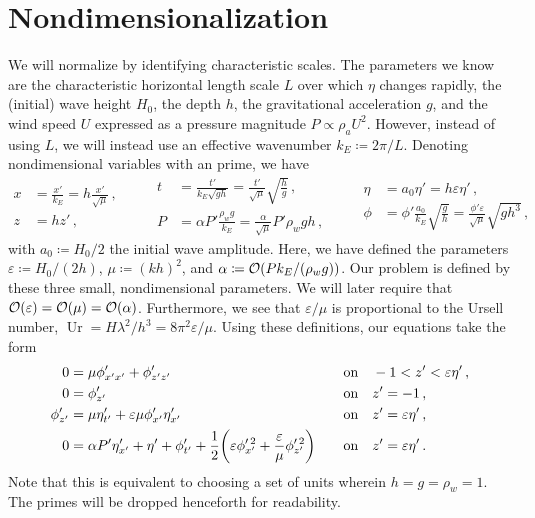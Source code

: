 \documentclass{jfm}
\DeclareMathOperator{\Ur}{Ur}
\renewcommand*{\epsilon}{\varepsilon}
\begin{document}
\section{Nondimensionalization}
We will normalize by identifying characteristic scales.
The parameters we know \apriori are the characteristic horizontal length
scale $L$ over which $\eta$ changes rapidly, the (initial) wave height
$H_0$, the depth $h$, the gravitational acceleration $g$, and the wind
speed $U$ expressed as a pressure magnitude $P \propto \rho_a U^2$.
However, instead of using $L$, we will instead use an effective
wavenumber $k_E \coloneqq 2 \pi/ L$.
Denoting nondimensional variables with an prime, we have
\begin{equation*}
  \begin{aligned}
  x &= \frac{x'}{k_E} = h \frac{x'}{\sqrt{\mu}}\,, \\
  z &= h z' \,,
  \end{aligned}
  \qquad
  \begin{aligned}
  t &= \frac{t'}{k_E\sqrt{g h}}
    = \frac{t'}{\sqrt{\mu}} \sqrt{\frac{h}{g}} \,, \\
  P &= \alpha P' \frac{\rho_w g}{k_E}
    = \frac{\alpha}{\sqrt{\mu}} P' \rho_w g h \,,
  \end{aligned}
  \qquad
  \begin{aligned}
  \eta &= a_0 \eta' = h \epsilon \eta' \,, \\
  \phi &= \phi'\frac{a_0}{k_E}\sqrt{\frac{g}{h}}
    = \frac{\phi'\epsilon}{\sqrt{\mu}}\sqrt{g h^3} \,,
  \end{aligned}
\end{equation*}
with $a_0 \coloneqq H_0/2$ the initial wave amplitude.
Here, we have defined the parameters $\epsilon \coloneqq H_0/(2h)$, $\mu
\coloneqq (kh)^2$, and $\alpha \coloneqq \order{P k_E/(\rho_w g)}$.
Our problem is defined by these three small, nondimensional parameters.
We will later require that $\order{\epsilon} = \order{\mu} =
\order{\alpha}$.
Furthermore, we see that $\epsilon/\mu$ is proportional to the Ursell
number, $\Ur = H \lambda^2/h^3 = 8 \pi^2 \epsilon/\mu$.
Using these definitions, our equations take the form
\begin{alignat}{2}
  0 &= \mu \phi'_{x'x'} + \phi'_{z'z'} &&\qq{on}
    -1 < z' < \epsilon \eta' \,, \label{eq:laplace_nondim} \\
  0 &= \phi'_{z'} &&\qq{on} z'=-1 \,, \label{eq:bottom_bc_nondim} \\
  \phi'_{z'} &= \mu \eta'_{t'} +
    \epsilon \mu \phi'_{x'} \eta'_{x'} &&\qq{on} z' = \epsilon \eta' \,,
    \label{eq:kinematic_bc_nondim} \\
  0 &= \alpha P' \eta'_{x'} +  \eta' + \phi'_{t'} + \frac{1}{2}
    \pqty{\epsilon \phi_{x'}^{\prime \, 2} + \frac{\epsilon}{\mu}
    \phi_{z'}^{\prime \, 2}} &&\qq{on} z'= \epsilon \eta' \,.
    \label{eq:dynamic_bc_nondim}
\end{alignat}
Note that this is equivalent to choosing a set of units wherein $h = g =
\rho_w = 1$.
The primes will be dropped henceforth for readability.
\end{document}
